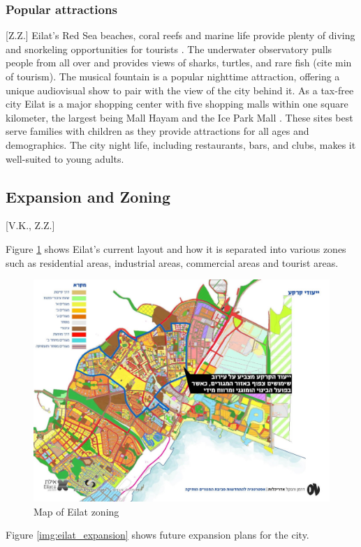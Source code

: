 \documentclass[12pt]{article}                       %
\begin{document}
\subsubsection{Popular attractions}[Z.Z.]
Eilat's Red Sea beaches, coral reefs and marine life provide plenty of diving and snorkeling opportunities for tourists \cite{Benner2017UpgradingEilat}. The underwater observatory pulls people from all over and provides views of sharks, turtles, and rare fish (cite min of tourism). The musical fountain is a popular nighttime attraction, offering a unique audiovisual show to pair with the view of the city behind it. As a tax-free city Eilat is a major shopping center with five shopping malls within one square kilometer, the largest being Mall Hayam and the Ice Park Mall \cite{Benner2017UpgradingEilat}. These sites best serve families with children as they provide attractions for all ages and demographics. The city night life, including restaurants, bars, and clubs, makes it well-suited to young adults.

\subsection{Expansion and Zoning}[V.K., Z.Z.]

Figure \ref{img:eilat_zoning} shows Eilat's current layout and how it is separated into various zones such as residential areas, industrial areas, commercial areas and tourist areas. 

\begin{figure}[H]
    \centering
    \includegraphics[width=12cm]{images/eilat_zoning.jpg}
    \caption{Map of Eilat zoning}
    \label{img:eilat_zoning}
\end{figure}
Figure \ref{img:eilat_expansion} shows future expansion plans for the city.
\end{document}

